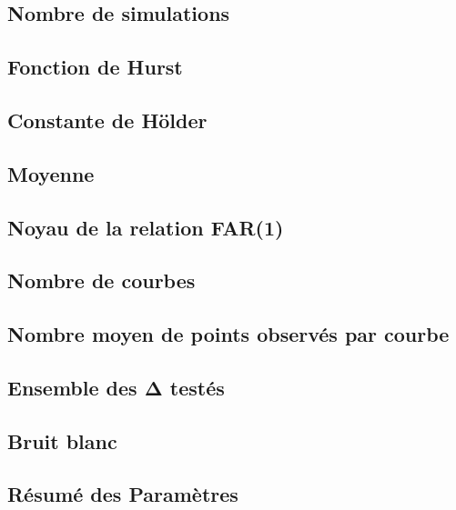
\subsection{Nombre de simulations}
\label{subsec:nb-simulations}


\subsection{Fonction de Hurst}
\label{sec:sim_fcn_hurst}


\subsection{Constante de Hölder}
\label{subsec:constante-holder}


\subsection{Moyenne}
\label{subsec:moyenne}


\subsection{Noyau de la relation FAR(1)}
\label{subsec:noyau-far}


\subsection{Nombre de courbes}
\label{subsec:nb-courbes}


\subsection{Nombre moyen de points observés par courbe}
\label{subsec:nb-moy-pts-obs-par-courbe}


\subsection{Ensemble des Δ testés}
\label{subsec:delta-test}


\subsection{Bruit blanc}
\label{subsec:bruit-blanc}


\subsection{Résumé des Paramètres}
\label{subsec:resume-params-simul}
